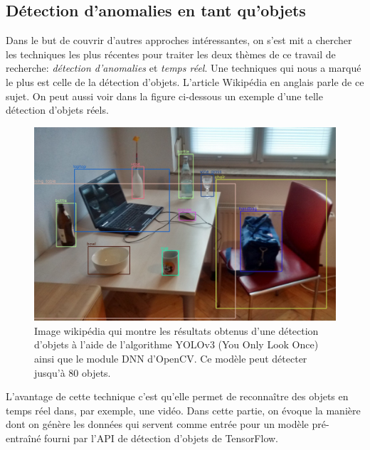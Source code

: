 \documentclass[french]{article}
\theoremstyle{mytheoremstyle}
\theoremstyle{mytheoremstyle}
\theoremstyle{myproblemstyle}
\begin{document}
        \subsection{Détection d'anomalies en tant qu'objets}
        Dans le but de couvrir d'autres approches intéressantes, on s'est mit a chercher les techniques les plus récentes pour traiter les deux thèmes de ce travail de recherche: \textit{détection d'anomalies} et \textit{temps réel}. Une techniques qui nous a marqué le plus est celle de la détection d'objets. L'article Wikipédia en anglais parle de ce sujet. On peut aussi voir dans la figure ci-dessous un exemple d'une telle détection d'objets réels.
        \begin{figure}[H]
            \centering
            \includegraphics[width=.8\textwidth]{images/real_objects.jpg}
            \caption{Image wikipédia qui montre les résultats obtenus d'une détection d'objets à l'aide de l'algorithme YOLOv3 (You Only Look Once) ainsi que le module DNN d'OpenCV. Ce modèle peut détecter jusqu'à 80 objets.}
            \label{}
        \end{figure}
        L'avantage de cette technique c'est qu'elle permet de reconnaître des objets en temps réel dans, par exemple, une vidéo. Dans cette partie, on évoque la manière dont on génère les données qui servent comme entrée pour un modèle pré-entraîné fourni par l'API de détection d'objets de TensorFlow.
\end{document}
